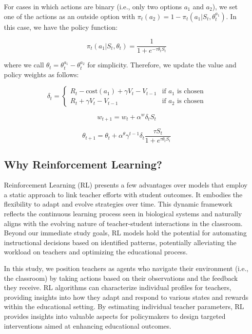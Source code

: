 \documentclass[
  number,
  preprint,
  3p,
  onecolumn]{elsarticle}
\begin{document}
For cases in which actions are binary (i.e., only two options \(a_1\)
and \(a_2\)), we set one of the actions as an outside option with
\(\pi_t(a_2) = 1 - \pi_t(a_1|S_t,\theta^{a_1}_t)\). In this case, we
have the policy function:

\[
\pi_t(a_1|S_t,\theta_t) = \frac{1}{1 + e^{-\tau \theta_t S_t}}
\]

where we call \(\theta_t = \theta^{a_1}_t - \theta^{a_2}_t\) for
simplicity. Therefore, we update the value and policy weights as
follows:

\[
\delta_t = 
\begin{cases}
R_{t} - \text{cost}(a_1) + \gamma V_t - V_{t-1} & \text{if } a_1 \text{ is chosen} \\
R_{t} + \gamma V_t - V_{t-1} & \text{if } a_2 \text{ is chosen}
\end{cases}
\]

\[
w_{t+1} = w_{t} + \alpha^w \delta_t S_t
\]

\[
\theta_{t+1} = \theta_{t} + \alpha^{\theta} \gamma^{t-1} \delta_t \frac{\tau S_t}{1 + e^{\tau \theta_t S_t}}
\]

\subsection{Why Reinforcement
Learning?}\label{why-reinforcement-learning}

Reinforcement Learning (RL) presents a few advantages over models that
employ a static approach to link teacher efforts with student outcomes.
It embodies the flexibility to adapt and evolve strategies over time.
This dynamic framework reflects the continuous learning process seen in
biological systems and naturally aligns with the evolving nature of
teacher-student interactions in the classroom. Beyond our immediate
study goals, RL models hold the potential for automating instructional
decisions based on identified patterns, potentially alleviating the
workload on teachers and optimizing the educational process.

In this study, we position teachers as agents who navigate their
environment (i.e., the classroom) by taking actions based on their
observations and the feedback they receive. RL algorithms can
characterize individual profiles for teachers, providing insights into
how they adapt and respond to various states and rewards within the
educational setting. By estimating individual teacher parameters, RL
provides insights into valuable aspects for policymakers to design
targeted interventions aimed at enhancing educational outcomes.
\end{document}
